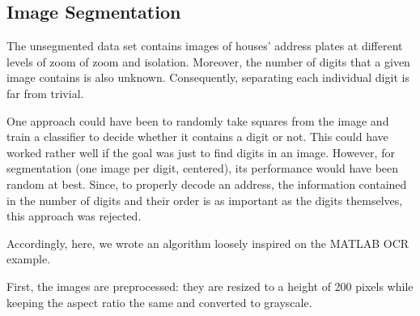 \documentclass{article} %
\begin{document}
\subsection{Image Segmentation}
The unsegmented data set contains images of houses' address plates at different levels of zoom of zoom and isolation. Moreover, the number of digits that a given image contains is also unknown. Consequently, separating each individual digit is far from trivial.

One approach could have been to randomly take squares from the image and train a classifier to decide whether it contains a digit or not. This could have worked rather well if the goal was just to find digits in an image. However, for segmentation (one image per digit, centered), its performance would have been random at best. Since, to properly decode an address, the information contained in the number of digits and their order is as important as the digits themselves, this approach was rejected.

Accordingly, here, we wrote an algorithm loosely inspired on the MATLAB OCR example\cite{automaticdetect}.

First, the images are preprocessed: they are resized to a height of 200 pixels while keeping the aspect ratio the same and converted to grayscale.
\end{document}
